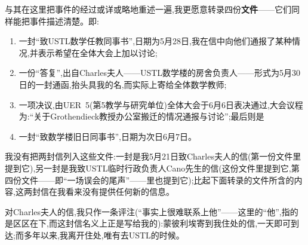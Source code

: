 与其在这里把事件的经过或详或略地重述一遍,我更愿意转录四份\textbf{文件}——它们同样能把事件描述清楚。即:
\begin{enumerate}
\item 一封“致USTL数学任教同事书”,日期为5月28日,我在信中向他们通报了某种情况,并表示希望在全体大会上加以讨论;
\item 一份“答复”,出自Charles夫人——USTL数学楼的房舍负责人——形式为5月30日的一封通函,抬头具我的名,而实际上寄给全体数学教师;
\item 一项决议,由UER~5(第5教学与研究单位)全体大会于6月6日表决通过,大会议程为:“关于Grothendieck教授办公室搬迁的情况通报与讨论”;最后则是
\item 一封“致数学楼旧日同事书”,日期为次日6月7日。
\end{enumerate}

我没有把两封信列入这些文件:一封是我5月21日致Charles夫人的信(第一份文件里提到它),另一封是我致USTL临时行政负责人Cano先生的信(这份文件里提到它,第四份文件——即“一场误会的尾声”——里也提到它);比起下面转录的文件所含的内容,这两封信在我看来没有提供任何新的信息。

对Charles夫人的信,我只作一条评注(“事实上很难联系上他”——这里的“他”,指的是区区在下,而这封信名义上正是写给我的):蒙彼利埃寄到我住处的信,一天即可到达;而多年以来,我离开住处,唯有去USTL的时候。


